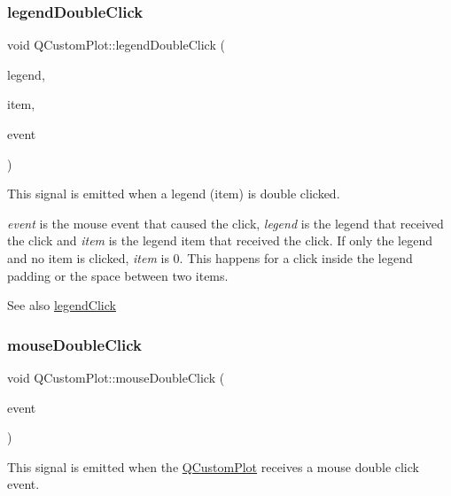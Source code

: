 \subsubsection{\texorpdfstring{legend\+Double\+Click}{legendDoubleClick}}
{\footnotesize\ttfamily void Q\+Custom\+Plot\+::legend\+Double\+Click (\begin{DoxyParamCaption}\item[{\mbox{\hyperlink{class_q_c_p_legend}{Q\+C\+P\+Legend}} $\ast$}]{legend,  }\item[{\mbox{\hyperlink{class_q_c_p_abstract_legend_item}{Q\+C\+P\+Abstract\+Legend\+Item}} $\ast$}]{item,  }\item[{Q\+Mouse\+Event $\ast$}]{event }\end{DoxyParamCaption})\hspace{0.3cm}{\ttfamily [signal]}}

This signal is emitted when a legend (item) is double clicked.

{\itshape event} is the mouse event that caused the click, {\itshape legend} is the legend that received the click and {\itshape item} is the legend item that received the click. If only the legend and no item is clicked, {\itshape item} is 0. This happens for a click inside the legend padding or the space between two items.

\begin{DoxySeeAlso}{See also}
\mbox{\hyperlink{class_q_custom_plot_a79cff0baafbca10a3aaf694d2d3b9ab3}{legend\+Click}} 
\end{DoxySeeAlso}
\mbox{\label{class_q_custom_plot_a9b232142c64fcf273a953ee08e5b90e9}} 
\subsubsection{\texorpdfstring{mouse\+Double\+Click}{mouseDoubleClick}}
{\footnotesize\ttfamily void Q\+Custom\+Plot\+::mouse\+Double\+Click (\begin{DoxyParamCaption}\item[{Q\+Mouse\+Event $\ast$}]{event }\end{DoxyParamCaption})\hspace{0.3cm}{\ttfamily [signal]}}

This signal is emitted when the \mbox{\hyperlink{class_q_custom_plot}{Q\+Custom\+Plot}} receives a mouse double click event. \mbox{\label{class_q_custom_plot_a742ca4f94688bed2a685fd8a56ce5704}} 
